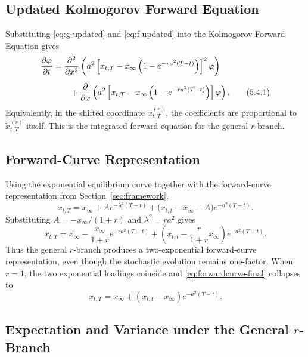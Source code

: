 \documentclass[12pt]{article}
\theoremstyle{statementstyle}
\begin{document}
\subsection{Updated Kolmogorov Forward Equation}
\label{subsec:updated-kfe}

Substituting \eqref{eq:g-updated} and \eqref{eq:f-updated} into the
Kolmogorov Forward Equation gives
\begin{align}
\frac{\partial \varphi}{\partial t}
&=
\frac{\partial^{2}}{\partial x^{2}}
\left(
a^{2}
\left[
x_{t,T}
-
x_{\infty}\left(1-e^{-ra^{2}(T-t)}\right)
\right]^{2}
\varphi
\right)
\notag\\[0.4em]
&\qquad
+
\frac{\partial}{\partial x}
\left(
a^{2}
\left[
x_{t,T}
-
x_{\infty}\left(1-e^{-ra^{2}(T-t)}\right)
\right]
\varphi
\right).
\tag{5.4.1}\label{eq:kfe-updated}
\end{align}
Equivalently, in the shifted coordinate
\(\widetilde{x}_{t,T}^{(r)}\), the coefficients are proportional to
\(\widetilde{x}_{t,T}^{(r)}\) itself. This is the integrated forward
equation for the general \(r\)-branch.

\subsection{Forward-Curve Representation}
\label{subsec:revised-forwardcurve}

Using the exponential equilibrium curve together with the forward-curve
representation from Section~\ref{sec:framework},
\[
x_{t,T}
=
x_{\infty}
+
A e^{-\lambda^{2}(T-t)}
+
\bigl(x_{t,t}-x_{\infty}-A\bigr)e^{-a^{2}(T-t)}.
\]
Substituting \(A=-x_{\infty}/(1+r)\) and
\(\lambda^{2}=ra^{2}\) gives
\begin{equation}
x_{t,T}
=
x_{\infty}
-
\frac{x_{\infty}}{1+r}e^{-ra^{2}(T-t)}
+
\left(
x_{t,t}
-
\frac{r}{1+r}x_{\infty}
\right)e^{-a^{2}(T-t)}.
\tag{5.5.1}\label{eq:forwardcurve-final}
\end{equation}
Thus the general \(r\)-branch produces a two-exponential forward-curve
representation, even though the stochastic evolution remains one-factor.
When \(r=1\), the two exponential loadings coincide and
\eqref{eq:forwardcurve-final} collapses to
\[
x_{t,T}=x_{\infty}+(x_{t,t}-x_{\infty})e^{-a^{2}(T-t)}.
\]

\subsection{Expectation and Variance under the General $r$-Branch}
\label{subsec:instantaneous}
\end{document}
